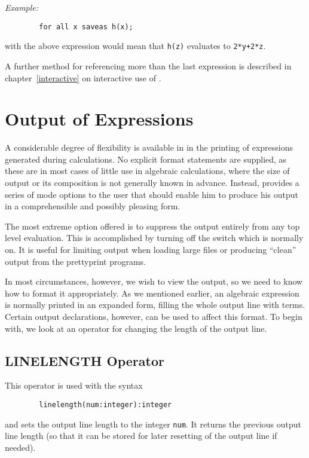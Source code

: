 \textit{Example:}
\begin{verbatim}
        for all x saveas h(x);
\end{verbatim}

with the above expression would mean that \texttt{h(z)} evaluates to
\texttt{2*y+2*z}.

A further method for referencing more than the last expression is described
in chapter~\ref{interactive} on interactive use of {\REDUCE}.


\section{Output of Expressions}

A considerable degree of flexibility is available in {\REDUCE} in the
printing of expressions generated during calculations.  No explicit format
statements are supplied, as these are in most cases of little use in
algebraic calculations, where the size of output or its composition is not
generally known in advance.  Instead, {\REDUCE} provides a series of mode
options to the user that should enable him to produce his output in a
comprehensible and possibly pleasing form.

\hypertarget{switch:OUTPUT}{}
The most extreme option offered is to suppress the output entirely from
any top level evaluation.  This is accomplished by turning off the switch
 which is normally on.  It is useful for
limiting output when loading large files or producing ``clean'' output from
the prettyprint programs.

In most circumstances, however, we wish to view the output, so we need to
know how to format it appropriately.  As we mentioned earlier, an
algebraic expression is normally printed in an expanded form, filling the
whole output line with terms.  Certain output declarations, however, can be used to affect this format.  To begin with,
we look at an operator for changing the length of the output line.

\subsection{LINELENGTH Operator}
\hypertarget{operator:LINELENGTH}{}

This operator is used with the syntax
\begin{verbatim}
        linelength(num:integer):integer
\end{verbatim}
and sets the output line length to the integer \texttt{num}. It returns the
previous output line length (so that it can be stored for later resetting
of the output line if needed).

